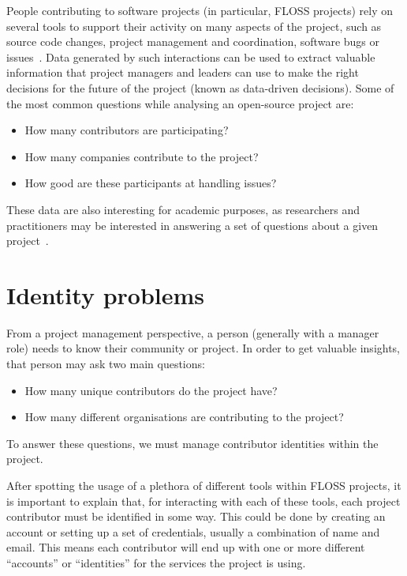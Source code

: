\documentclass[a4paper, 12pt]{book}
\begin{document}
People contributing to software projects (in particular, FLOSS projects) rely on several tools to support their activity on many aspects of the project, such as source code changes, project management and coordination, software bugs or issues~\cite{dabbish-et-al-socialcoding-github12}. Data generated by such interactions can be used to extract valuable information that project managers and leaders can use to make the right decisions for the future of the project (known as data-driven decisions). Some of the most common questions while analysing an open-source project are:

\begin{itemize}
    \item How many contributors are participating?
    \item How many companies contribute to the project?
    \item How good are these participants at handling issues? 
\end{itemize}

These data are also interesting for academic purposes, as researchers and practitioners may be interested in answering a set of questions about a given project~\cite{hemmati-et-al-msr-cookbook13}.

\section{Identity problems}
\label{sec:intro-identities}

From a project management perspective, a person (generally with a manager role) needs to know their community or project. In order to get valuable insights, that person may ask two main questions:

\begin{itemize}
    \item How many unique contributors do the project have?
    \item How many different organisations are contributing to the project?
\end{itemize}

To answer these questions, we must manage contributor identities within the project.

After spotting the usage of a plethora of different tools within FLOSS projects, it is important to explain that, for interacting with each of these tools, each project contributor must be identified in some way. This could be done by creating an account or setting up a set of credentials, usually a combination of name and email. This means each contributor will end up with one or more different ``accounts'' or ``identities'' for the services the project is using.
\end{document}
